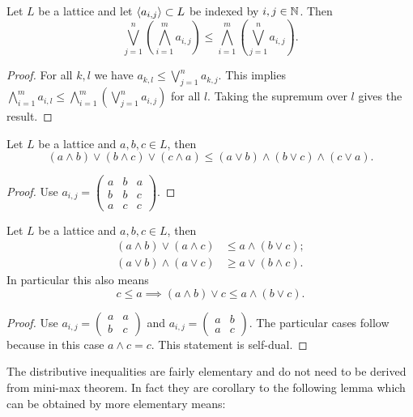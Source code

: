 \begin{proposition}
Let $L$ be a lattice and let $\langle a_{i,j} \rangle\subset L$ be indexed by $i,j\in \mathbb{N}$. Then
\[ \bigvee_{j=1}^n \left(\bigwedge_{i=1}^m a_{i,j}\right) \leq \bigwedge_{i=1}^m \left(\bigvee_{j=1}^n a_{i,j}\right). \]
\end{proposition}
\begin{proof}
For all $k,l$ we have $a_{k,l}\leq \bigvee_{j=1}^n a_{k,j}$. This implies $\bigwedge_{i=1}^m a_{i,l} \leq \bigwedge_{i=1}^m \left(\bigvee_{j=1}^n a_{i,j}\right)$ for all $l$. Taking the supremum over $l$ gives the result.
\end{proof}
\begin{corollary}
Let $L$ be a lattice and $a,b,c \in L$, then
\[ (a\wedge b) \vee (b\wedge c) \vee (c\wedge a) \leq (a\vee b)\wedge (b\vee c) \wedge (c\vee a). \]
\end{corollary}
\begin{proof}
Use $a_{i,j} = \begin{pmatrix}
a & b & a \\ b & b & c \\ a & c & c
\end{pmatrix}$.
\end{proof}
\begin{corollary} \label{distributiveInequality}
Let $L$ be a lattice and $a,b,c \in L$, then
\begin{align*}
(a\wedge b)\vee (a\wedge c) &\leq a\wedge (b \vee c); \\
(a\vee b)\wedge (a\vee c) &\geq a\vee (b \wedge c).
\end{align*}
In particular this also means
\[ c \leq a \implies (a\wedge b)\vee c \leq a\wedge (b\vee c).  \]
\end{corollary}
\begin{proof}
Use $a_{i,j} = \begin{pmatrix}
a & a \\ b & c 
\end{pmatrix}$ and $a_{i,j} = \begin{pmatrix}
a & b \\ a & c 
\end{pmatrix}$. The particular cases follow because in this case $a\wedge c = c$. This statement is self-dual.
\end{proof}
The distributive inequalities are fairly elementary and do not need to be derived from mini-max theorem. 
In fact they are corollary to the following lemma which can be obtained by more elementary means:
